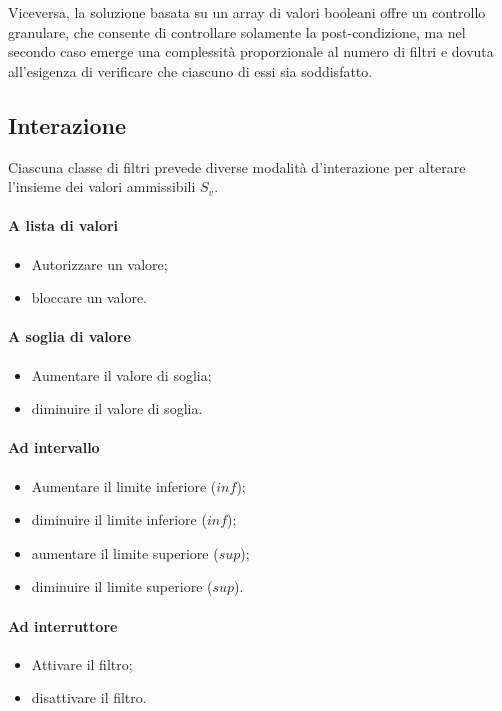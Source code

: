 Viceversa, la soluzione basata su un array di valori booleani offre un controllo granulare, che consente di controllare solamente la post-condizione, ma nel secondo caso emerge una complessità proporzionale al numero di filtri e dovuta all'esigenza di verificare che ciascuno di essi sia soddisfatto.

\subsection{Interazione}
Ciascuna classe di filtri prevede diverse modalità d'interazione per alterare l'insieme dei valori ammissibili $S_v$.

\paragraph{A lista di valori}
\begin{itemize}
  \item Autorizzare un valore;
  \item bloccare un valore.
\end{itemize}

\paragraph{A soglia di valore}
\begin{itemize}
  \item Aumentare il valore di soglia;
  \item diminuire il valore di soglia.
\end{itemize}

\paragraph{Ad intervallo}
\begin{itemize}
  \item Aumentare il limite inferiore ($inf$);
  \item diminuire il limite inferiore ($inf$);
  \item aumentare il limite superiore ($sup$);
  \item diminuire il limite superiore ($sup$).
\end{itemize}

\paragraph{Ad interruttore}
\begin{itemize}
  \item Attivare il filtro;
  \item disattivare il filtro.
\end{itemize}

